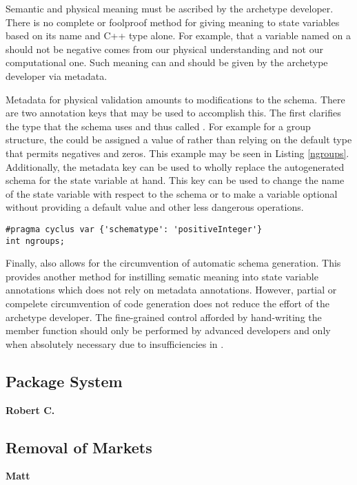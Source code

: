 Semantic and physical meaning must be ascribed by the archetype developer. There
is no complete or foolproof method for giving meaning to state variables based
on its name and C++ type alone. For example, that a variable named  
on a  should not be negative comes from our physical understanding
and not our computational one. Such meaning can and should be given by the 
archetype developer via metadata.

Metadata for physical validation amounts to modifications to the schema. There are 
two annotation keys that may be used to accomplish this.  The first clarifies the 
type that the schema uses and thus called .  For example for a
group structure, the  could be assigned a value of 
 rather than relying on the default  type
that permits negatives and zeros. This example may be seen in Listing \ref{ngroups}. 
Additionally, the metadata key 
can be used to wholly replace the autogenerated schema for the state variable at 
hand. This key can be used to change the name of the state variable with respect 
to the schema or to make a variable optional without providing a default value 
and other less dangerous operations.

\begin{lstlisting}[caption={Physical Constraint Addion via `schematype'}, label=ngroups]
#pragma cyclus var {'schematype': 'positiveInteger'}
int ngroups;
\end{lstlisting}

Finally, \Cyclus also allows for the circumvention of automatic schema generation. This 
provides another method for instilling sematic meaning into state variable annotations
which does not rely on metadata annotations.
However, partial or compelete circumvention of code generation does not reduce 
the effort of the archetype developer. The fine-grained control afforded by 
hand-writing the  member function should only be performed 
by advanced developers and only when absolutely necessary due to insufficiencies 
in \cycpp.

\subsection{Package System}

\textbf{Robert C.}

\subsection{Removal of Markets}

\textbf{Matt}
